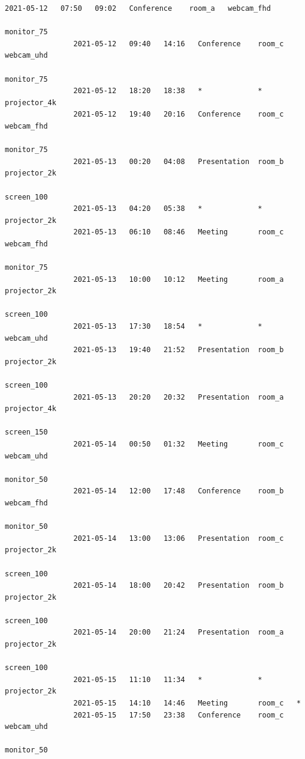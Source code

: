 \documentclass{article}
\begin{document}
\begin{Verbatim}[gobble=8]
                2021-05-12   07:50   09:02   Conference    room_a   webcam_fhd
                                                                    monitor_75
                2021-05-12   09:40   14:16   Conference    room_c   webcam_uhd
                                                                    monitor_75
                2021-05-12   18:20   18:38   *             *        projector_4k
                2021-05-12   19:40   20:16   Conference    room_c   webcam_fhd
                                                                    monitor_75
                2021-05-13   00:20   04:08   Presentation  room_b   projector_2k
                                                                    screen_100
                2021-05-13   04:20   05:38   *             *        projector_2k
                2021-05-13   06:10   08:46   Meeting       room_c   webcam_fhd
                                                                    monitor_75
                2021-05-13   10:00   10:12   Meeting       room_a   projector_2k
                                                                    screen_100
                2021-05-13   17:30   18:54   *             *        webcam_uhd
                2021-05-13   19:40   21:52   Presentation  room_b   projector_2k
                                                                    screen_100
                2021-05-13   20:20   20:32   Presentation  room_a   projector_4k
                                                                    screen_150
                2021-05-14   00:50   01:32   Meeting       room_c   webcam_uhd
                                                                    monitor_50
                2021-05-14   12:00   17:48   Conference    room_b   webcam_fhd
                                                                    monitor_50
                2021-05-14   13:00   13:06   Presentation  room_c   projector_2k
                                                                    screen_100
                2021-05-14   18:00   20:42   Presentation  room_b   projector_2k
                                                                    screen_100
                2021-05-14   20:00   21:24   Presentation  room_a   projector_2k
                                                                    screen_100
                2021-05-15   11:10   11:34   *             *        projector_2k
                2021-05-15   14:10   14:46   Meeting       room_c   *
                2021-05-15   17:50   23:38   Conference    room_c   webcam_uhd
                                                                    monitor_50

\end{Verbatim}
\end{document}
